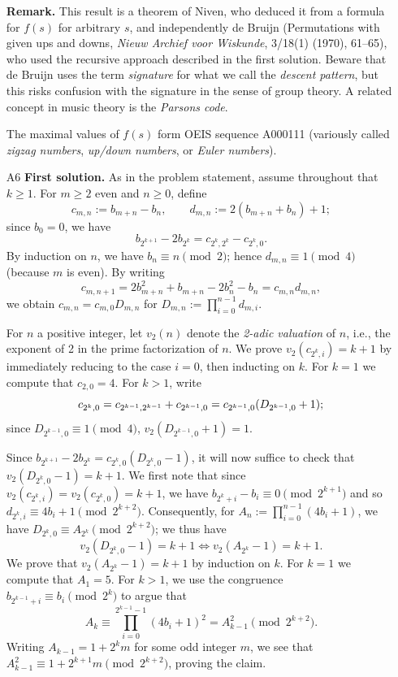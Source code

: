 \documentclass[amssymb,twocolumn,pra,10pt,aps]{revtex4-1}
\begin{document}
\begin{itemize}
\noindent
\textbf{Remark.}
This result is a theorem of Niven,
who deduced it from a formula for $f(s)$ for arbitrary $s$,
and independently de Bruijn
(Permutations with given ups and downs, \textit{Nieuw Archief voor Wiskunde}, 3/18(1) (1970), 61--65),
who used the recursive approach described in the first solution.
Beware that de Bruijn uses the term \emph{signature} for what we call the \emph{descent pattern}, but this risks confusion with the signature in the sense of group theory. A related concept in music theory is the \emph{Parsons code}.

The maximal values of $f(s)$ form OEIS sequence A000111 (variously called \emph{zigzag numbers}, \emph{up/down numbers}, or \emph{Euler numbers}).

\item[A6]
\noindent
\textbf{First solution.}
As in the problem statement, assume throughout that $k \geq 1$.
For $m \geq 2$ even and $n \geq 0$, define
\[
c_{m,n} := b_{m+n}-b_n, \qquad d_{m,n} := 2(b_{m+n}+b_n) + 1;
\]
since $b_0 = 0$, we have 
\[
b_{2^{k+1}} - 2b_{2^k} = c_{2^k,2^k} - c_{2^k,0}.
\]
By induction on $n$, we have $b_n \equiv n \pmod{2}$;
hence $d_{m,n} \equiv 1 \pmod{4}$ (because $m$ is even).
By writing
\[
c_{m,n+1} = 2b_{m+n}^2 +b_{m+n} - 2b_n^2 - b_n = c_{m,n}d_{m,n},
\]
we obtain $c_{m,n} = c_{m,0} D_{m,n}$ for $D_{m,n} := \prod_{i=0}^{n-1} d_{m,i}$.

For $n$ a positive integer, let $v_2(n)$ denote the \emph{2-adic valuation} of $n$, i.e., the exponent of 2 in the prime factorization of $n$.
We prove $v_2(c_{2^k,i}) = k+1$ by immediately reducing to the case $i=0$,
then inducting on $k$. 
For $k=1$ we compute that $c_{2,0} = 4$.
For $k > 1$, write
\[
c_{2^k,0} = c_{2^{k-1},2^{k-1}}+c_{2^{k-1},0} \\
= c_{2^{k-1},0} (D_{2^{k-1},0}+1);
\]
since $D_{2^{k-1},0} \equiv 1 \pmod{4}$, $v_2(D_{2^{k-1},0}+1) = 1$.

Since $b_{2^{k+1}} - 2b_{2^k} = c_{2^k,0} (D_{2^k,0}-1)$, it will now suffice to check that $v_2(D_{2^k,0}-1) = k+1$. We first note that since 
$v_2(c_{2^k,i}) = v_2(c_{2^k,0}) = k+1$, we have
$b_{2^k+i}-b_i \equiv 0 \pmod{2^{k+1}}$ and so $d_{2^k,i} \equiv 4b_i + 1 \pmod{2^{k+2}}$.
Consequently, for $A_{n} := \prod_{i=0}^{n-1} (4b_i+1)$, we have $D_{2^k,0} \equiv A_{2^k} \pmod{2^{k+2}}$; we thus have
\[
v_2(D_{2^k,0}-1) = k+1 \Longleftrightarrow v_2(A_{2^k} -1) = k+1.
\]
We prove that $v_2(A_{2^k} -1) = k+1$ by induction on $k$. For $k=1$ we compute that $A_1 = 5$.
For $k > 1$, we use the congruence $b_{2^{k-1}+i} \equiv b_i \pmod{2^k}$ to argue that
\[
A_k \equiv \prod_{i=0}^{2^{k-1}-1} (4b_i+1)^2 = A_{k-1}^2 \pmod{2^{k+2}}.
\]
Writing $A_{k-1} = 1 + 2^{k}m$ for some odd integer $m$,
we see that $A_{k-1}^2 \equiv 1 + 2^{k+1} m \pmod{2^{k+2}}$, proving the claim.


\end{itemize}
\end{document}
